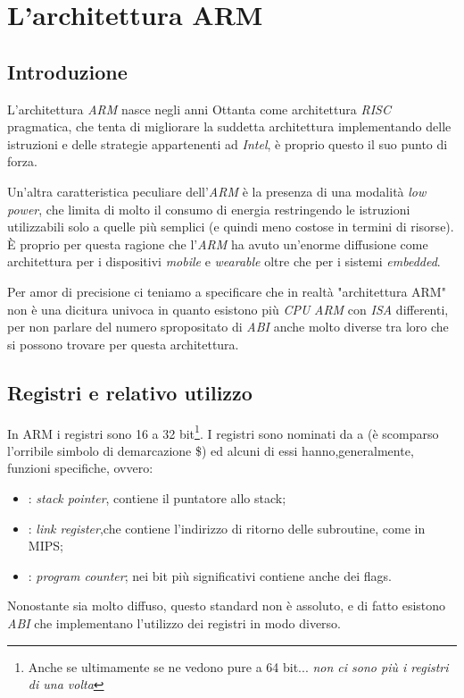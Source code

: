 \documentclass[class=book, crop=false, oneside]{standalone}
\begin{document}
\chapter{L'architettura ARM}

\section{Introduzione}
L'architettura \emph{ARM} nasce negli anni Ottanta come architettura \emph{RISC} pragmatica, che tenta di migliorare la suddetta architettura implementando delle istruzioni e delle strategie appartenenti ad \emph{Intel}, è proprio questo il suo punto di forza.

Un'altra caratteristica peculiare dell'\emph{ARM} è la presenza di una modalità \emph{low power}, che limita di molto il consumo di energia restringendo le istruzioni utilizzabili solo a quelle più semplici (e quindi meno costose in termini di risorse). È proprio per questa ragione che l'\emph{ARM} ha avuto un'enorme diffusione come architettura per i dispositivi \emph{mobile} e \emph{wearable} oltre che per i sistemi \emph{embedded}.

Per amor di precisione ci teniamo a specificare che in realtà "architettura ARM" non è una dicitura univoca in quanto esistono più \emph{CPU} \emph{ARM} con \emph{ISA} differenti, per non parlare del numero spropositato di \emph{ABI} anche molto diverse tra loro che si possono trovare per questa architettura.

\section{Registri e relativo utilizzo}
In ARM i registri sono 16 a 32 bit\footnote{Anche se ultimamente se ne vedono pure a 64 bit... \emph{non ci sono più i registri di una volta}}. I registri sono nominati da  a  (è scomparso l'orribile simbolo di demarcazione \$) ed alcuni di essi hanno,generalmente, funzioni specifiche, ovvero:

\begin{itemize}
	\item {}: \emph{stack pointer}, contiene il puntatore allo stack;
	\item {}: \emph{link register},che contiene l'indirizzo di ritorno delle subroutine, come  in MIPS;
	\item {}: \emph{program counter}; nei bit più significativi contiene anche dei flags.
\end{itemize}
Nonostante sia molto diffuso, questo standard non è assoluto, e di fatto esistono \emph{ABI} che implementano l'utilizzo dei registri in modo diverso.
\end{document}
